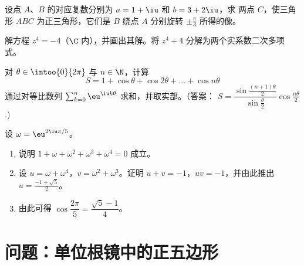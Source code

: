 \begin{exercise}[$\star\star$]\label{exo:g12:complex:7}
设点 $A$、$B$ 的对应复数分别为 $a = 1 + \iu$ 和 $b = 3 + 2\iu$，求
两点 $C$，使三角形 $ABC$ 为正三角形，它们是
$B$ 绕点 $A$ 分别旋转 $\pm\frac{\pi}{3}$ 所得的像。
\end{exercise}

\begin{exercise}[$\star\star\star$]\label{exo:g12:complex:8}
解方程 $z^4 = -4$（$\C$ 内），并画出其解。将
$z^4 + 4$ 分解为两个实系数二次多项式。
\end{exercise}

\begin{exercise}[$\star\star\star$]\label{exo:g12:complex:9}
对 $\theta \in \intoo{0}{2\pi}$ 与 $n \in \N$，计算
\[
S = 1 + \cos\theta + \cos 2\theta + \dots + \cos n\theta
\]
通过对等比数列
$\sum_{k=0}^n \eu^{\iu k\theta}$ 求和，并取实部。（答案：
$S = \dfrac{\sin\frac{(n+1)\theta}{2}}{\sin\frac{\theta}{2}}
\cos\frac{n\theta}{2}$.)
\end{exercise}

\begin{exercise}[$\star\star\star$]\label{exo:g12:complex:10}
设 $\omega = \eu^{2\iu\pi/5}$。
\begin{enumerate}
  \item 说明 $1 + \omega + \omega^2 + \omega^3 + \omega^4 = 0$ 成立。
  \item 设 $u = \omega + \omega^4$，$v = \omega^2 + \omega^3$。证明
        $u + v = -1$，$uv = -1$，并由此推出 $u = \frac{-1+\sqrt5}{2}$。
  \item 由此可得 $\cos\dfrac{2\pi}{5} = \dfrac{\sqrt5 - 1}{4}$。
\end{enumerate}
\end{exercise}

\section{问题：单位根镜中的正五边形}

